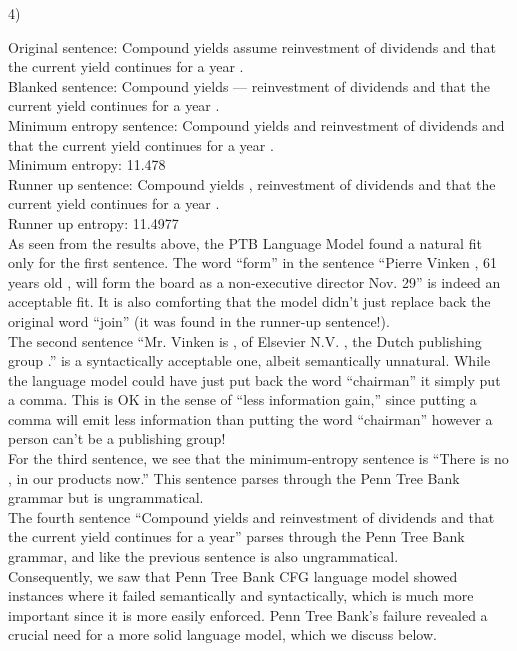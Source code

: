 \documentclass{article}[12pt]
\theoremstyle{definition}
\begin{document}
\begin{flushleft}
4)
\end{flushleft}
Original sentence: Compound yields assume reinvestment of dividends and that the current yield continues for a year .\\
Blanked sentence: Compound yields --- reinvestment of dividends and that the current yield continues for a year .\\
Minimum entropy sentence: Compound yields and reinvestment of dividends and that the current yield continues for a year .\\
Minimum entropy: 11.478\\
Runner up sentence: Compound yields , reinvestment of dividends and that the current yield continues for a year .\\
Runner up entropy: 11.4977\\

As seen from the results above, the PTB Language Model found a natural fit only for the first sentence. The word “form” in the sentence “Pierre Vinken , 61 years old , will form the board as a non-executive director Nov. 29” is indeed an acceptable fit. It is also comforting that the model didn’t just replace back the original word “join” (it was found in the runner-up sentence!). \\

The second sentence “Mr. Vinken is , of Elsevier N.V. , the Dutch publishing group .” is a syntactically acceptable one, albeit semantically unnatural. While the language model could have just put back the word “chairman” it simply put a comma. This is OK in the sense of “less information gain,” since putting a comma will emit less information than putting the word “chairman” however a person can’t be a publishing group!\\ 

For the third sentence, we see that the minimum-entropy sentence is “There is no , in our products now.” This sentence parses through the Penn Tree Bank grammar but is ungrammatical. \\

The fourth sentence “Compound yields and reinvestment of dividends and that the current yield continues for a year” parses through the Penn Tree Bank grammar, and like the previous sentence is also ungrammatical.  \\

Consequently, we saw that Penn Tree Bank CFG language model showed instances where it failed semantically and syntactically, which is much more important since it is more easily enforced. Penn Tree Bank’s failure revealed a crucial need for a more solid language model, which we discuss below.\\
\end{document}
